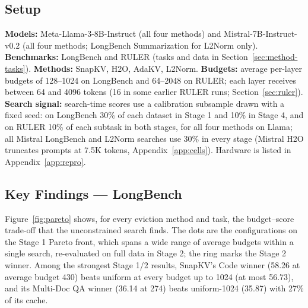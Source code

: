 \documentclass[11pt]{article}
\begin{document}
\begin{table}[t]

  \centering
  \scriptsize
  \setlength{\tabcolsep}{6.5pt}
  \renewcommand{\arraystretch}{0.82}
  
  \caption{\textbf{RULER results (full data, string-match accuracy averaged over 11 subtasks).} Uniform allocation vs.\ MOSAIC's final configuration (the better of Winner and NAS-refined) at the same average per-layer budget; the better is in bold. $^\dagger$Rescaled Stage 3 winner (no Stage 4 search). Llama-3-8B: Llama-3-8B-Instruct, of which SnapKV and H2O at B1024 and above used an earlier 3--4-candidate selection; Mistral-7B: Mistral-7B-Instruct-v0.2.}
  \label{tab:ruler-summary}
\end{table}







\subsection{Setup}

\textbf{Models:} Meta-Llama-3-8B-Instruct (all four methods) and Mistral-7B-Instruct-v0.2 (all four methods; LongBench Summarization for L2Norm only). \textbf{Benchmarks:} LongBench and RULER (tasks and data in Section~\ref{sec:method-tasks}). \textbf{Methods:} SnapKV, H2O, AdaKV, L2Norm. \textbf{Budgets:} average per-layer budgets of 128--1024 on LongBench and 64--2048 on RULER; each layer receives between 64 and 4096 tokens (16 in some earlier RULER runs; Section~\ref{sec:ruler}). \textbf{Search signal:} search-time scores use a calibration subsample drawn with a fixed seed: on LongBench 30\% of each dataset in Stage 1 and 10\% in Stage 4, and on RULER 10\% of each subtask in both stages, for all four methods on Llama; all Mistral LongBench and L2Norm searches use 30\% in every stage (Mistral H2O truncates prompts at 7.5K tokens, Appendix~\ref{app:cells}). Hardware is listed in Appendix~\ref{app:repro}.





\subsection{Key Findings — LongBench}
\label{sec:which-stage}

Figure~\ref{fig:pareto} shows, for every eviction method and task, the budget--score trade-off that the unconstrained search finds. The dots are the configurations on the Stage 1 Pareto front, which spans a wide range of average budgets within a single search, re-evaluated on full data in Stage 2; the ring marks the Stage 2 winner. Among the strongest Stage 1/2 results, SnapKV's Code winner (58.26 at average budget 430) beats uniform at every budget up to 1024 (at most 56.73), and its Multi-Doc QA winner (36.14 at 274) beats uniform-1024 (35.87) with 27\% of its cache.
\end{document}
